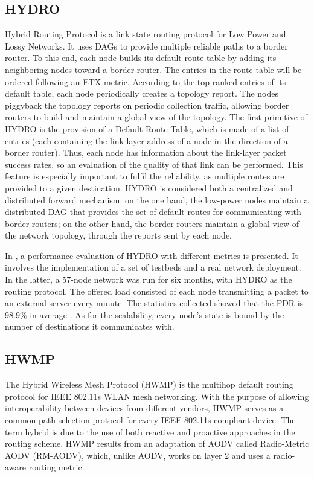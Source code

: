 \documentclass[10pt,twocolumn,twoside,submit]{JCNtran}
\begin{document}
\subsection{HYDRO}\label{hydro}


Hybrid Routing Protocol \cite{Dawson2010} is a link state routing protocol for Low Power and Lossy Networks. It uses DAGs to provide multiple reliable paths to a border router. To this end, each node builds its default route table by adding its neighboring nodes toward a border router. The entries in the route table will be ordered following an ETX metric. According to the top ranked entries of its default table, each node periodically creates a topology report. The nodes piggyback the topology reports on periodic collection traffic, allowing border routers to build and maintain a global view of the topology. The first primitive of HYDRO is the provision of a Default Route Table, which is made of a list of entries (each containing the link-layer address of a node in the direction of a border router). Thus, each node has information about the link-layer packet success rates, so an evaluation of the quality of that link can be performed. This feature is especially important to fulfil the reliability, as multiple routes are provided to a given destination. HYDRO is considered both a centralized and distributed forward mechanism: on the one hand, the low-power nodes maintain a distributed DAG that provides the set of default routes for communicating with border routers; on the other hand, the border routers maintain a global view of the network topology, through the reports sent by each node. 

In \cite{Dawson2010}, a performance evaluation of HYDRO with different metrics is presented. It involves the implementation of a set of testbeds and a real network deployment. In the latter, a 57-node network was run for six months, with HYDRO as the routing protocol. The offered load consisted of each node transmitting a packet to an external server every minute. The statistics collected showed that the PDR is 98.9\% in average . As for the scalability, every node's state is bound by the number of destinations it communicates with. 

\subsection{HWMP}\label{hwmp}

The Hybrid Wireless Mesh Protocol (HWMP) is the multihop default routing protocol for IEEE 802.11s WLAN mesh networking. With the purpose of allowing interoperability between devices from different vendors, HWMP serves as a common path selection protocol for every IEEE 802.11s-compliant device. The term hybrid is due to the use of both reactive and proactive approaches in the routing scheme. HWMP results from an adaptation of AODV called Radio-Metric AODV (RM-AODV), which, unlike AODV, works on layer 2 and uses a radio-aware routing metric. 
\end{document}
